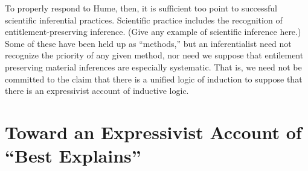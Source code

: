\documentclass{article}                     %
\begin{document}
To properly respond to Hume, then, it is sufficient too point to successful scientific inferential practices.  Scientific practice includes the recognition of entitlement-preserving inference.  (Give any example of scientific inference here.)  Some of these have been held up as ``methods,'' but an inferentialist need not recognize the priority of any given method, nor need we suppose that entilement preserving material inferences are especially systematic.  That is, we need not be committed to the claim that there is a unified logic of induction to  
suppose that there is an expressivist account of inductive logic.



\section{Toward an Expressivist Account of ``Best Explains''}
\end{document}
